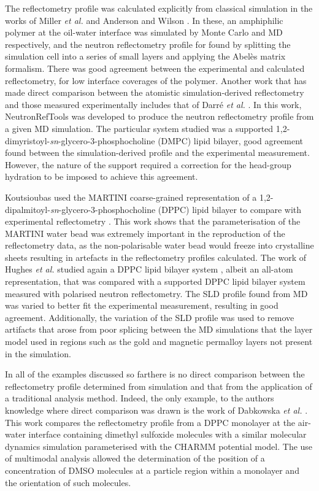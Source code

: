 \documentclass[amsmath,amssymb,twocolumn,superscriptaddress,aps,prl]{revtex4-1}
\begin{document}
The reflectometry profile was calculated explicitly from classical simulation in the works of Miller \emph{et al.} and Anderson and Wilson \cite{Miller2003,Anderson2004}.
In these, an amphiphilic polymer at the oil-water interface was simulated by Monte Carlo and MD respectively, and the neutron reflectometry profile for found by splitting the simulation cell into a series of small layers and applying the Abel\`{e}s matrix formalism.
There was good agreement between the experimental and calculated reflectometry, for low interface coverages of the polymer.
Another work that has made direct comparison between the atomistic simulation-derived reflectometry and those measured experimentally includes that of Darr\'{e} \emph{et al.} \cite{Darre2015}.
In this work, NeutronRefTools was developed to produce the neutron reflectometry profile from a given MD simulation.
The particular system studied was a supported 1,2-dimyristoyl-\emph{sn}-glycero-3-phosphocholine (DMPC) lipid bilayer, good agreement found between the simulation-derived profile and the experimental measurement.
However, the nature of the support required a correction for the head-group hydration to be imposed to achieve this agreement.

Koutsioubas used the MARTINI coarse-grained representation of a 1,2-dipalmitoyl-\emph{sn}-glycero-3-phosphocholine (DPPC) lipid bilayer to compare with experimental reflectometry \cite{Koutsioubas2016}.
This work shows that the parameterisation of the MARTINI water bead was extremely important in the reproduction of the reflectometry data, as the non-polarisable water bead would freeze into crystalline sheets resulting in artefacts in the reflectometry profiles calculated.
The work of Hughes \emph{et al.} studied again a DPPC lipid bilayer system \cite{Hughes2016}, albeit an all-atom representation, that was compared with a supported DPPC lipid bilayer system measured with polarised neutron reflectometry.
The SLD profile found from MD was varied to better fit the experimental measurement, resulting in good agreement.
Additionally, the variation of the SLD profile was used to remove artifacts that arose from poor splicing between the MD simulations that the layer model used in regions such as the gold and magnetic permalloy layers not present in the simulation.

In all of the examples discussed so farthere is no direct comparison between the reflectometry profile determined from simulation and that from the application of a traditional analysis method.
Indeed, the only example, to the authors knowledge where direct comparison was drawn is the work of Dabkowska \emph{et al.} \cite{Dabkowska2014}.
This work compares the reflectometry profile from a DPPC monolayer at the air-water interface containing dimethyl sulfoxide molecules with a similar molecular dynamics simulation parameterised with the CHARMM potential model.
The use of multimodal analysis allowed the determination of the position of a concentration of DMSO molecules at a particle region within a monolayer and the orientation of such molecules.
\end{document}
